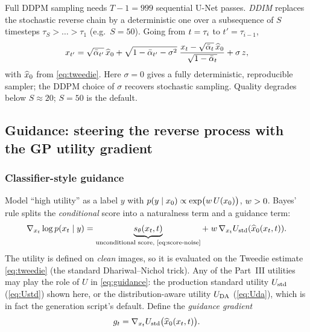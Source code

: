 Full DDPM sampling needs $T-1=999$ sequential U-Net passes. \emph{DDIM} replaces
the stochastic reverse chain by a deterministic one over a subsequence of $S$
timesteps $\tau_{S}>\dots>\tau_{1}$ (e.g.\ $S=50$). Going from $t=\tau_{i}$ to
$t'=\tau_{i-1}$,
\begin{equation}
x_{t'}=\sqrt{\bar\alpha_{t'}}\,\widehat{x}_{0}
   +\sqrt{1-\bar\alpha_{t'}-\sigma^{2}}\;
     \frac{x_{t}-\sqrt{\bar{\alpha}_{t}}\,\widehat{x}_{0}}{\sqrt{1-\bar{\alpha}_{t}}}
   +\sigma\,z,
\label{eq:ddim}
\end{equation}
with $\widehat{x}_{0}$ from \eqref{eq:tweedie}. Here $\sigma=0$ gives a fully deterministic,
reproducible sampler; the DDPM choice of $\sigma$ recovers stochastic sampling.
Quality degrades below $S\!\approx\!20$; $S=50$ is the default.

\subsection{Guidance: steering the reverse process with the GP utility gradient}
\label{sec:diff-guide}

\subsubsection{Classifier-style guidance}
Model ``high utility'' as a label $y$ with $p(y\mid x_{0})\propto\exp\!\big(w\,
U(x_{0})\big)$, $w>0$. Bayes' rule splits the \emph{conditional} score into a
naturalness term and a guidance term:
\begin{equation}
\nabla_{x_{t}}\log p(x_{t}\mid y)
  =\underbrace{s_{\theta}(x_{t},t)}_{\text{unconditional score, \eqref{eq:score-noise}}}
  +\;w\,\nabla_{x_{t}}U_{\mathrm{std}}(\widehat{x}_{0}(x_{t},t)).
\label{eq:guidance}
\end{equation}
The utility is defined on \emph{clean} images, so it is evaluated on the Tweedie
estimate \eqref{eq:tweedie} (the standard Dhariwal--Nichol trick). Any of the
Part~III utilities may play the role of $U$ in \eqref{eq:guidance}: the production
standard utility $U_{\mathrm{std}}$ (\eqref{eq:Ustd}) shown here, or the distribution-aware
utility $U_{\mathrm{DA}}$ (\eqref{eq:Uda}), which is in fact the generation script's default.
Define the \emph{guidance gradient}
\begin{equation}
g_{t}=\nabla_{x_{t}}U_{\mathrm{std}}\big(\widehat{x}_{0}(x_{t},t)\big).
\label{eq:ggrad}
\end{equation}

